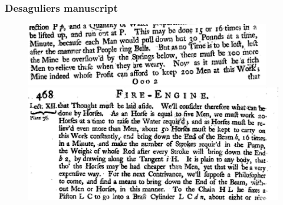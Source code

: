 \documentclass[final]{beamer}
\begin{document}
\begin{frame}
		\frametitle{Desaguliers manuscript}
\begin{figure}[p!]
		\label{fig:desagulier}		
		\center
		\includegraphics[width=0.95\textwidth]{desagulier1}\\
		\includegraphics[width=1.05\textwidth]{desagulier2}
\end{figure}
\end{frame}
\end{document}
